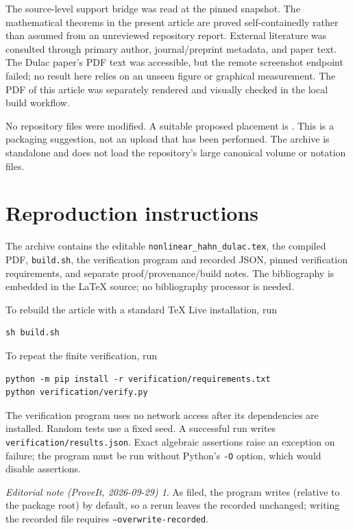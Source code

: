 \documentclass[11pt,a4paper]{article}
\numberwithin{equation}{section}
\theoremstyle{definition}
\theoremstyle{remark}
\newtheorem*{ednote}{Editorial note (ProveIt, 2026-09-29)}
\begin{document}
The source-level support bridge was read at the pinned snapshot.
The mathematical theorems in the present article are proved
self-containedly rather than assumed from an unreviewed repository
report. External literature was consulted through primary author,
journal/preprint metadata, and paper text. The Dulac paper's PDF
text was accessible, but the remote screenshot endpoint failed;
no result here relies on an unseen figure or graphical measurement.
The PDF of this article was separately rendered and visually checked
in the local build workflow.

No repository files were modified. A suitable proposed placement is
.
This is a packaging suggestion, not an upload that has been performed.
The archive is standalone and does not load the repository's large
canonical volume or notation files.

\section{Reproduction instructions}
\label{app:reproduce}

The archive contains the editable \texttt{nonlinear\_hahn\_dulac.tex},
the compiled PDF, \texttt{build.sh}, the verification program and
recorded JSON, pinned verification requirements, and separate
proof/provenance/build notes. The bibliography is embedded in the
LaTeX source; no bibliography processor is needed.

To rebuild the article with a standard TeX Live installation, run
\begin{verbatim}
sh build.sh
\end{verbatim}
To repeat the finite verification, run
\begin{verbatim}
python -m pip install -r verification/requirements.txt
python verification/verify.py
\end{verbatim}
The verification program uses no network access after its dependencies
are installed. Random tests use a fixed seed. A successful run writes
\texttt{verification/results.json}. Exact algebraic assertions raise
an exception on failure; the program must be run without Python's
\texttt{-O} option, which would disable assertions.
\begin{ednote}
As filed, the program writes  (relative to the
package root) by default, so a rerun leaves the recorded
 unchanged; writing the recorded file
requires \texttt{--overwrite-recorded}.
\end{ednote}
\end{document}
